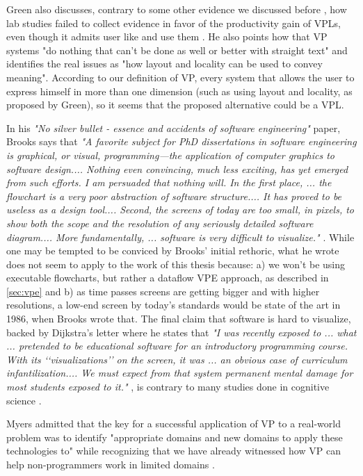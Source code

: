 \begin{itemsize}
Green also discusses, contrary to some other evidence we discussed before \cite{Cardellini2002}\cite{Burnett1999},
how lab studies failed to collect evidence in favor of the productivity gain of
VPLs, even though it admits user like and use them \cite{Shu1988}. He also points
how that VP systems "do nothing that can’t be done as well or better with straight text"
and identifies the real issues as "how layout and locality can be used to convey meaning".
According to our definition of VP, every system that allows the user to express
himself in more than one dimension (such as using layout and locality, as proposed
by Green), so it seems that the proposed alternative could be a VPL.

In his \textit{"No silver bullet - essence and accidents of software engineering"} paper, Brooks
says that \textit{"A favorite subject for PhD dissertations in software engineering is graphical, or visual,
programming—the application of computer graphics to software design....
Nothing even convincing, much less exciting, has yet emerged from such efforts. I am persuaded that nothing will. In
the first place, ... the flowchart is a very poor abstraction of software structure....
It has proved to be useless as a design tool.... Second, the screens of today are too small, in pixels, to show both
the scope and the resolution of any seriously detailed software diagram.... More fundamentally, ...
software is very difficult to visualize."} \cite{Brooks1986}. While one may be tempted
to be conviced by Brooks' initial rethoric, what he wrote does not seem to apply
to the work of this thesis because: a) we won't be using executable flowcharts,
but rather a dataflow VPE approach, as described in \ref{sec:vpe} and b) as time passes screens
are getting bigger and with higher resolutions, a low-end screen by today's standards
would be state of the art in 1986, when Brooks wrote that. The final claim that
software is hard to visualize, backed by Dijkstra's letter where he states that
\textit{"I was recently exposed to ... what ... pretended to be educational software for an introductory programming course.
With its ‘‘visualizations’’ on the screen, it was ... an obvious case of curriculum
infantilization.... We must expect from that system permanent mental damage for most students
exposed to it."} \cite{dijkstra1989cruelty}, is contrary to many studies done in cognitive science
\cite{Lewis1987}\cite{cunniff1986does}\cite{Carlisle2005}.

Myers admitted that the key for a successful application of VP to a real-world
problem was to identify "appropriate domains and new domains to apply these
technologies to" while recognizing that we have already witnessed how VP can help
non-programmers work in limited domains \cite{Myers1990}.


\end{itemsize}
